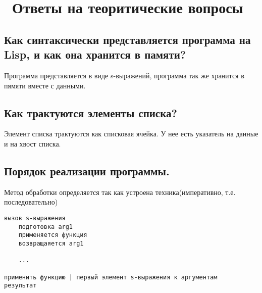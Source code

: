 \chapter{ Ответы на теоритические вопросы}
\label{cha:design}
\section{ Как синтаксически представляется программа на Lisp, и как она хранится в памяти?}
    Программа представляется в виде s-выражений, программа так же хранится в пямяти вместе с данными.
\section{ Как трактуются элементы списка?}
    Элемент списка трактуются как списковая ячейка. У нее есть указатель на данные и на хвост списка.
\section{ Порядок реализации программы.}
    Метод обработки определяется так как устроена техника(императивно, т.е. последовательно)

\begin{lstlisting}
вызов s-выражения
    подготовка arg1
    применяется функция
    возвращаяется arg1

    ...

применить функцию | первый элемент s-выражения к аргументам
результат
\end{lstlisting}
